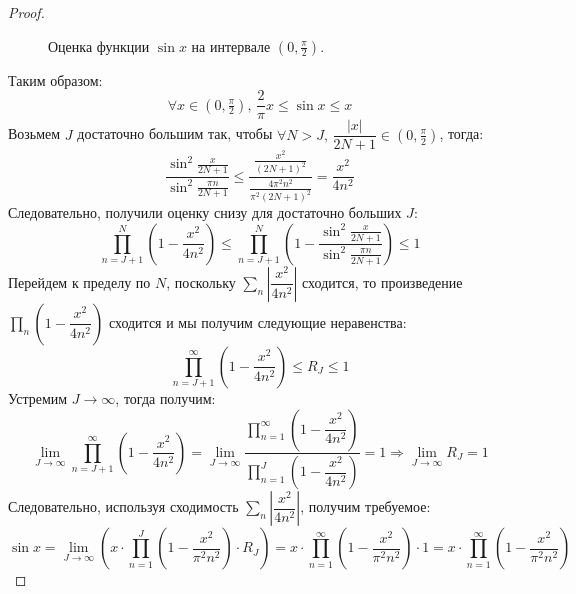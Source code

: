 \documentclass[12pt]{article}
\theoremstyle{definition}
\begin{document}
\begin{proof}
\begin{figure}[H]
		\label{2_1}
		\caption{Оценка функции $\sin{x}$ на интервале $\left(0, \tfrac{\pi}{2}\right)$.}
		\label{fig:Оценка синуса}
	\end{figure}	
	Таким образом:
	$$
		\forall x \in \left(0, \tfrac{\pi}{2}\right), \, \dfrac{2}{\pi}x \leq \sin{x} \leq x 
	$$
	Возьмем $J$ достаточно большим так, чтобы $\forall N > J, \, \dfrac{|x|}{2N + 1} \in \left(0, \tfrac{\pi}{2}\right)$, тогда:
	$$
		\dfrac{\sin^2 \tfrac{x}{2N + 1}}{\sin^2 \tfrac{\pi n}{2N +1}} \leq \dfrac{\tfrac{x^2}{(2N+1)^2}}{\tfrac{4\pi^2 n^2}{\pi^2(2N+1)^2}} = \dfrac{x^2}{4n^2}	
	$$
	Следовательно, получили оценку снизу для достаточно больших $J$:
	$$
		\prod\limits_{n = J + 1}^N \left(1 - \dfrac{x^2}{4n^2}\right) \leq
		\prod\limits_{n = J + 1}^N \left(1 - \dfrac{\sin^2 \tfrac{x}{2N + 1}}{\sin^2 \tfrac{\pi n}{2N +1}}\right) \leq 1
	$$
	Перейдем к пределу по $N$, поскольку $\displaystyle \sum\limits_n \left|\dfrac{x^2}{4n^2}\right|$ сходится, то произведение $\displaystyle \prod\limits_{n} \left(1 - \dfrac{x^2}{4n^2}\right)$ сходится и мы получим следующие неравенства:
	$$
		\prod\limits_{n = J + 1}^{\infty} \left(1 - \dfrac{x^2}{4n^2}\right) \leq R_J \leq 1
	$$
	Устремим $J \to \infty$, тогда получим:
	$$
		\lim\limits_{J \to \infty}\prod\limits_{n = J + 1}^{\infty} \left(1 - \dfrac{x^2}{4n^2}\right) =
		\lim\limits_{J \to \infty}\dfrac{\prod\limits_{n = 1}^{\infty} \left(1 - \dfrac{x^2}{4n^2}\right)}{\prod\limits_{n = 1}^{J} \left(1 - \dfrac{x^2}{4n^2}\right)} = 1 \Rightarrow \lim\limits_{J \to \infty} R_J = 1
	$$
	Следовательно, используя сходимость $\displaystyle \sum\limits_n \left|\dfrac{x^2}{4n^2}\right|$, получим требуемое:
	$$
		\sin{x} = \lim\limits_{J \to \infty} \left(x{\cdot}\prod\limits_{n = 1}^J\left(1 - \dfrac{x^2}{\pi^2 n^2}\right){\cdot}R_J \right) = x{\cdot}\prod\limits_{n = 1}^{\infty}\left(1 - \dfrac{x^2}{\pi^2 n^2}\right){\cdot}1 = x{\cdot}\prod\limits_{n = 1}^{\infty}\left(1 - \dfrac{x^2}{\pi^2 n^2}\right)
	$$
\end{proof}
\end{document}
